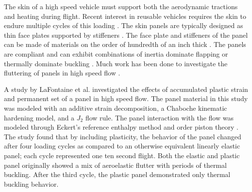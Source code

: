 \documentclass[conf]{new-aiaa}
\begin{document}
The skin of a high speed vehicle must support both
the aerodynamic tractions and heating during flight.
Recent interest in reusable vehicles requires
the skin to endure multiple cycles of this loading
\cite{
  walker_falcon_htv_3X_a_resuable_hypersonic_test_bed,
  eason_structures_perspective_on_the_challenges_associated_with_analyzing_reuasble_hypersonic_platform,
  zuchowski_AVIATR_Predictive_capability_for_hypersonic_structural_response_and_life_prediction_phase_II,
  lafontaine_effects_of_strain_hardeing_on_response_of_skin_panels_in_hypersonic_flow}.
The skin panels are typically designed as thin face plates supported 
by stiffeners 
\cite{
  mcnamara_aeroelastic_and_aerothermoelastic_analysis_in_hypersonic_flow_past_present_and_future}.
The face plate and stiffeners of the panel 
can be made of materials on the order
of hundredth of an inch thick
\cite{
  plews_a_two_scale_generalized_finite_element_approach_for_modeling_localized_thermoplasticity,
  zuchowski_AVIATR_Predictive_capability_for_hypersonic_structural_response_and_life_prediction_phase_II}.
The panels are compliant and can exhibit combinations of
inertia dominate flapping or thermally dominate buckling
\cite{
  thornton_coupled_flow_thermal_and_structural_analysis_of_aerodynamically_heated_panels,
  mei_review_of_nonlinear_panel_flutter_at_supersonic_and_hypersonic_speeds}.
Much work has been done to investigate the fluttering 
of panels in high speed flow
\cite{
  mcnamara_aeroelastic_and_aerothermoelastic_analysis_in_hypersonic_flow_past_present_and_future,
  riley_interaction_between_aerothermally_compliant_structures_and_boudnary_layer_transition_in_hypersonic_flow,
  spottswood_exploring_the_response_of_a_thin_flexible_panel,
  savino_aerothermodynamic_study_of_ultrahigh_termperature_cermaic_winglet_for_atmospheric_reentry_test,
  nydick_hypersonic_panel_flutter_studies_on_cruved_panels,
  lafontaine_effects_of_strain_hardeing_on_response_of_skin_panels_in_hypersonic_flow}.


A study by LaFontaine et al.
\cite{
  lafontaine_effects_of_strain_hardeing_on_response_of_skin_panels_in_hypersonic_flow}
investigated the effects of accumulated 
plastic strain and permanent set of a panel in high speed flow.
The panel material in this study was modeled with an additive 
strain decomposition, a Chaboche kinematic hardening model,
and a $J_2$ flow rule. 
The panel interaction with the flow was modeled through
Eckert's reference enthalpy method 
\cite{
  eckert_engineering_relations_for_heat_transfer_and_friction_in_high_velocity_laminar_and_turbulent_flow}
and  order piston theory
\cite{
  meijer_generalized_formulation_and_review_of_piston_theory_for_airfoils}.
The study found that by including plasticity, 
the behavior of the panel changed after four loading cycles 
as compared to an otherwise equivalent linearly elastic panel;
each cycle represented one ten second flight.
Both the elastic and plastic panel originally showed a mix of 
aeroelastic flutter with periods of thermal buckling. 
After the third cycle, the plastic panel demonstrated only thermal
buckling behavior.
\end{document}
